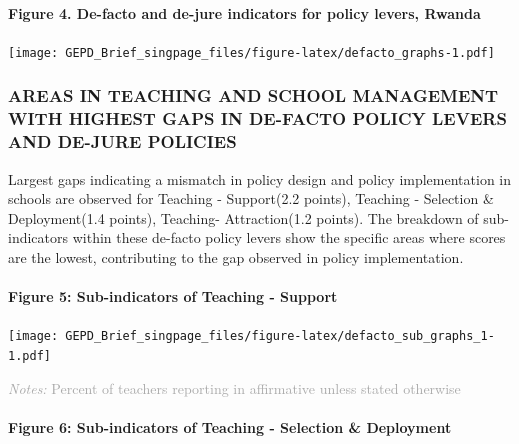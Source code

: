 \documentclass[
]{article}
\begin{document}
\hypertarget{figure-4.-de-facto-and-de-jure-indicators-for-policy-levers-rwanda}{%
\paragraph{Figure 4. De-facto and de-jure indicators for policy levers,
Rwanda}\label{figure-4.-de-facto-and-de-jure-indicators-for-policy-levers-rwanda}}

\texttt{[image: GEPD\_Brief\_singpage\_files/figure-latex/defacto\_graphs-1.pdf]}

\hypertarget{areas-in-teaching-and-school-management-with-highest-gaps-in-de-facto-policy-levers-and-de-jure-policies}{%
\subsubsection{\texorpdfstring{\textbf{AREAS IN TEACHING AND SCHOOL
MANAGEMENT WITH HIGHEST GAPS IN DE-FACTO POLICY LEVERS AND DE-JURE
POLICIES}}{AREAS IN TEACHING AND SCHOOL MANAGEMENT WITH HIGHEST GAPS IN DE-FACTO POLICY LEVERS AND DE-JURE POLICIES}}\label{areas-in-teaching-and-school-management-with-highest-gaps-in-de-facto-policy-levers-and-de-jure-policies}}

Largest gaps indicating a mismatch in policy design and policy
implementation in schools are observed for Teaching - Support(2.2
points), Teaching - Selection \& Deployment(1.4 points), Teaching-
Attraction(1.2 points). The breakdown of sub-indicators within these
de-facto policy levers show the specific areas where scores are the
lowest, contributing to the gap observed in policy implementation.
\vfill\null

\hypertarget{figure-5-sub-indicators-of-teaching---support}{%
\paragraph{Figure 5: Sub-indicators of Teaching -
Support}\label{figure-5-sub-indicators-of-teaching---support}}

\texttt{[image: GEPD\_Brief\_singpage\_files/figure-latex/defacto\_sub\_graphs\_1-1.pdf]}

{\scriptsize
    \textcolor{darkgray}{\textit{Notes:} Percent of teachers reporting in affirmative unless stated otherwise}
  }

\hypertarget{figure-6-sub-indicators-of-teaching---selection-deployment}{%
\paragraph{Figure 6: Sub-indicators of Teaching - Selection \&
Deployment}\label{figure-6-sub-indicators-of-teaching---selection-deployment}}
\end{document}
